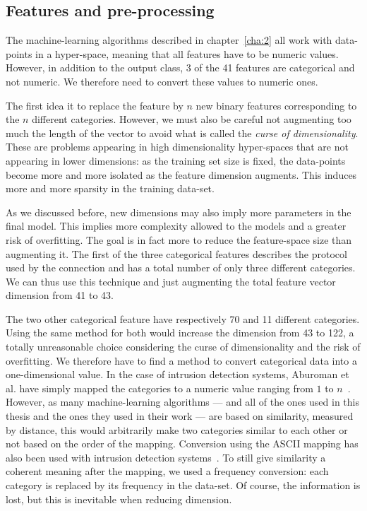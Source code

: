 \subsection{Features and pre-processing}
The machine-learning algorithms described in chapter~\ref{cha:2} all work with data-points in a hyper-space, meaning that all features have to be numeric values. However, in addition to the output class, 3 of the 41 features are categorical and not numeric. We therefore need to convert these values to numeric ones. 

The first idea it to replace the feature by $n$ new binary features corresponding to the $n$ different categories. However, we must also be careful not augmenting too much the length of the vector to avoid what is called the \emph{curse of dimensionality}. These are problems appearing in high dimensionality hyper-spaces that are not appearing in lower dimensions: as the training set size is fixed, the data-points become more and more isolated as the feature dimension augments. This induces more and more sparsity in the training data-set. 

As we discussed before, new dimensions may also imply more parameters in the final model. This implies more complexity allowed to the models and a greater risk of overfitting. The goal is in fact more to reduce the feature-space size than augmenting it. The first of the three categorical features describes the protocol used by the connection and has a total number of only three different categories. We can thus use this technique and just augmenting the total feature vector dimension from 41 to 43.

The two other categorical feature have respectively 70 and 11 different categories. Using the same method for both would increase the dimension from 43 to 122, a totally unreasonable choice considering the curse of dimensionality and the risk of overfitting. We therefore have to find a method to convert categorical data into a one-dimensional value. In the case of intrusion detection systems, Aburoman et al. have simply mapped the categories to a numeric value ranging from $1$ to $n$~\cite{Aburomman2016ASystem}. However, as many machine-learning algorithms --- and all of the ones used in this thesis and the ones they used in their work --- are based on similarity, measured by distance, this would arbitrarily make two categories similar to each other or not based on the order of the mapping. Conversion using the ASCII mapping has also been used with intrusion detection systems~\cite{Soheily-Khah2018IntrusionDataset}. To still give similarity a coherent meaning after the mapping, we used a frequency conversion: each category is replaced by its frequency in the data-set. Of course, the information is lost, but this is inevitable when reducing dimension.

